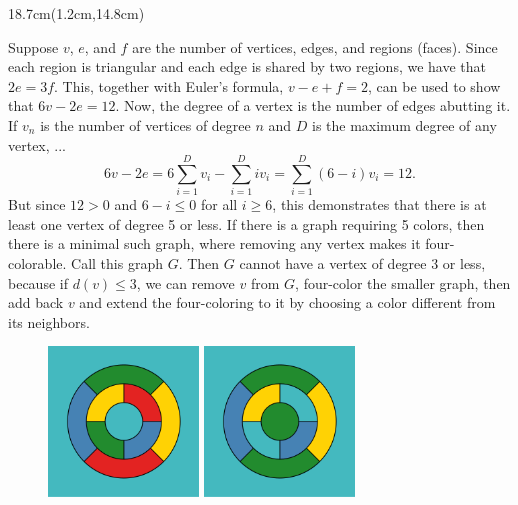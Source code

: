 \documentclass[11pt,a4paper,twoside]{book}
\newenvironment{positionedparagraph}[4]{%
	\begin{textblock*}{#1}(#2,#3)
		\noindent\textbf{#4}\par\medskip
	}{%
	\end{textblock*}
}
\begin{document}
\begin{positionedparagraph}{18.7cm}{1.2cm}{14.8cm}
\
Suppose \( v \), \( e \), and \( f \) are the number of vertices, edges, and regions (faces). Since each region is triangular and each edge is shared by two regions, we have that \( 2e = 3f \). This, together with Euler's formula, \( v - e + f = 2 \), can be used to show that \( 6v - 2e = 12 \). Now, the degree of a vertex is the number of edges abutting it. If \( v_n \) is the number of vertices of degree \( n \) and \( D \) is the maximum degree of any vertex, ...\\
\[
6v - 2e = 6 \sum_{i=1}^{D} v_i - \sum_{i=1}^{D} i v_i = \sum_{i=1}^{D} (6 - i) v_i = 12.
\]
But since \( 12 > 0 \) and \( 6 - i \leq 0 \) for all \( i \geq 6 \), this demonstrates that there is at least one vertex of degree 5 or less.
If there is a graph requiring 5 colors, then there is a minimal such graph, where removing any vertex makes it four-colorable. Call this graph \( G \). Then \( G \) cannot have a vertex of degree 3 or less, because if \( d(v) \leq 3 \), we can remove \( v \) from \( G \), four-color the smaller graph, then add back \( v \) and extend the four-coloring to it by choosing a color different from its neighbors.


\end{positionedparagraph}

\vspace{6.cm}
\begin{figure}[htbp]
	\centering
	\begin{minipage}{0.45\textwidth}
		\centering
		\includegraphics[width=4cm]{myimages/pic5.png}
	\end{minipage}
	\hspace{-2cm}
	\begin{minipage}{0.45\textwidth}
		\centering
		\includegraphics[width=4cm]{myimages/pic6.png}
	\end{minipage}
\end{figure}
\end{document}
